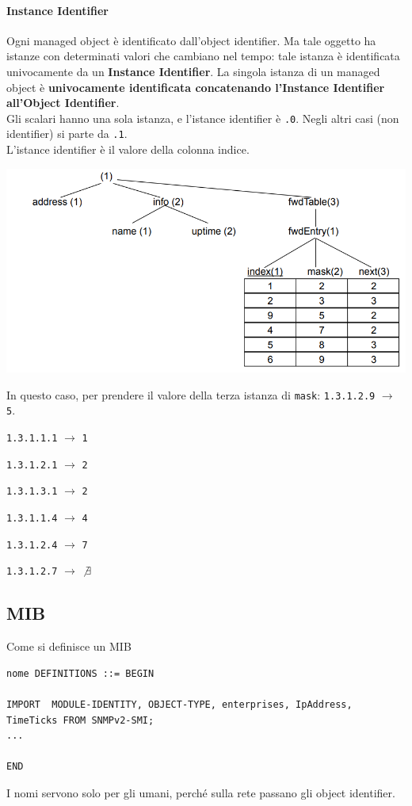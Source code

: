 \documentclass[10pt]{book}
\begin{document}
\paragraph{Instance Identifier} Ogni managed object è identificato dall'object identifier. Ma tale oggetto ha istanze con determinati valori che cambiano nel tempo: tale istanza è identificata univocamente da un \textbf{Instance Identifier}. La singola istanza di un managed object è \textbf{univocamente identificata concatenando l'Instance Identifier all'Object Identifier}.\\
Gli scalari hanno una sola istanza, e l'istance identifier è \texttt{.0}. Negli altri casi (non identifier) si parte da \texttt{.1}.\\
L'istance identifier è il valore della colonna indice.
\begin{center}
	\includegraphics[scale=0.7]{mibusecasetable.png}
\end{center}
In questo caso, per prendere il valore della terza istanza di \texttt{mask}: \texttt{1.3.1.2.9} $\rightarrow$ \texttt{5}.
\begin{multicols}{2}
\begin{list}{}{Altri esempi:}
	\item \texttt{1.3.1.1.1} $\rightarrow$ \texttt{1}
	\item \texttt{1.3.1.2.1} $\rightarrow$ \texttt{2}
	\item \texttt{1.3.1.3.1} $\rightarrow$ \texttt{2}
	\item 
	\item \texttt{1.3.1.1.4} $\rightarrow$ \texttt{4}
	\item \texttt{1.3.1.2.4} $\rightarrow$ \texttt{7}
	\item \texttt{1.3.1.2.7} $\rightarrow$ $\not\exists$
\end{list}
\end{multicols}
\subsection{MIB}
Come si definisce un MIB
\begin{verbatim}
nome DEFINITIONS ::= BEGIN

IMPORT	MODULE-IDENTITY, OBJECT-TYPE, enterprises, IpAddress, TimeTicks	FROM SNMPv2-SMI;
...

END
\end{verbatim}
I nomi servono solo per gli umani, perché sulla rete passano gli object identifier.
\end{document}

